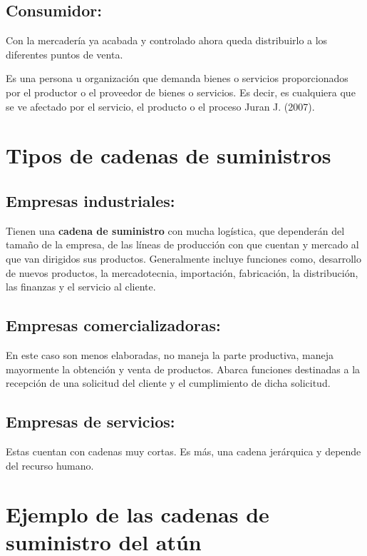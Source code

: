 \documentclass[
  jou,
  floatsintext,
  longtable,
  a4paper,
  nolmodern,
  notxfonts,
  notimes,
  12pt,
  colorlinks=true,linkcolor=blue,citecolor=blue,urlcolor=blue]{apa7}
\begin{document}
\subsection{Consumidor:}\label{consumidor}

Con la mercadería ya acabada y controlado ahora queda distribuirlo a los
diferentes puntos de venta.

Es una persona u organización que demanda bienes o servicios
proporcionados por el productor o el proveedor de bienes o servicios. Es
decir, es cualquiera que se ve afectado por el servicio, el producto o
el proceso Juran J. (2007).

\section{Tipos de cadenas de
suministros}\label{tipos-de-cadenas-de-suministros}

\subsection{Empresas industriales:}\label{empresas-industriales}

Tienen una \textbf{cadena de suministro} con mucha logística, que
dependerán del tamaño de la empresa, de las líneas de producción con que
cuentan y mercado al que van dirigidos sus productos. Generalmente
incluye funciones como, desarrollo de nuevos productos, la
mercadotecnia, importación, fabricación, la distribución, las finanzas y
el servicio al cliente.

\subsection{Empresas
comercializadoras:}\label{empresas-comercializadoras}

En este caso son menos elaboradas, no maneja la parte productiva, maneja
mayormente la obtención y venta de productos. Abarca funciones
destinadas a la recepción de una solicitud del cliente y el cumplimiento
de dicha solicitud.

\subsection{Empresas de servicios:}\label{empresas-de-servicios}

Estas cuentan con cadenas muy cortas. Es más, una cadena jerárquica y
depende del recurso humano.

\section{Ejemplo de las cadenas de suministro del
atún}\label{ejemplo-de-las-cadenas-de-suministro-del-atuxfan}
\end{document}
